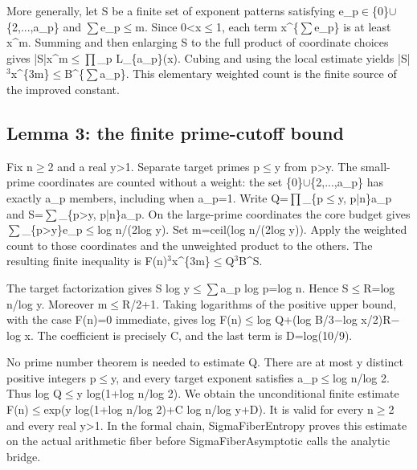 \documentclass[11pt,a4paper]{article}
\begin{document}
More generally, let S be a finite set of exponent patterns satisfying e\_p\ensuremath{\in}\{0\}\ensuremath{\cup}\{2,...,a\_p\} and \ensuremath{\sum}e\_p\ensuremath{\leq}m. Since 0<x\ensuremath{\leq}1, each term x\textasciicircum{}\{\ensuremath{\sum}e\_p\} is at least x\textasciicircum{}m. Summing and then enlarging S to the full product of coordinate choices gives |S|x\textasciicircum{}m\ensuremath{\leq}\ensuremath{\prod}\_p L\_\{a\_p\}(x). Cubing and using the local estimate yields |S|\ensuremath{^3}x\textasciicircum{}\{3m\}\ensuremath{\leq}B\textasciicircum{}\{\ensuremath{\sum}a\_p\}. This elementary weighted count is the finite source of the improved constant.

\subsection{Lemma 3: the finite prime-cutoff bound}
Fix n\ensuremath{\geq}2 and a real y>1. Separate target primes p\ensuremath{\leq}y from p>y. The small-prime coordinates are counted without a weight: the set \{0\}\ensuremath{\cup}\{2,...,a\_p\} has exactly a\_p members, including when a\_p=1. Write Q=\ensuremath{\prod}\_\{p\ensuremath{\leq}y, p|n\}a\_p and S=\ensuremath{\sum}\_\{p>y, p|n\}a\_p. On the large-prime coordinates the core budget gives \ensuremath{\sum}\_\{p>y\}e\_p\ensuremath{\leq}log n/(2log y). Set m=ceil(log n/(2log y)). Apply the weighted count to those coordinates and the unweighted product to the others. The resulting finite inequality is F(n)\ensuremath{^3}x\textasciicircum{}\{3m\}\ensuremath{\leq}Q\ensuremath{^3}B\textasciicircum{}S.

The target factorization gives S log y\ensuremath{\leq}\ensuremath{\sum}a\_p log p=log n. Hence S\ensuremath{\leq}R=log n/log y. Moreover m\ensuremath{\leq}R/2+1. Taking logarithms of the positive upper bound, with the case F(n)=0 immediate, gives log F(n)\ensuremath{\leq}log Q+(log B/3\ensuremath{-}log x/2)R\ensuremath{-}log x. The coefficient is precisely C, and the last term is D=log(10/9).

No prime number theorem is needed to estimate Q. There are at most y distinct positive integers p\ensuremath{\leq}y, and every target exponent satisfies a\_p\ensuremath{\leq}log n/log 2. Thus log Q\ensuremath{\leq}y log(1+log n/log 2). We obtain the unconditional finite estimate F(n)\ensuremath{\leq}exp(y log(1+log n/log 2)+C log n/log y+D). It is valid for every n\ensuremath{\geq}2 and every real y>1. In the formal chain, SigmaFiberEntropy proves this estimate on the actual arithmetic fiber before SigmaFiberAsymptotic calls the analytic bridge.
\end{document}
